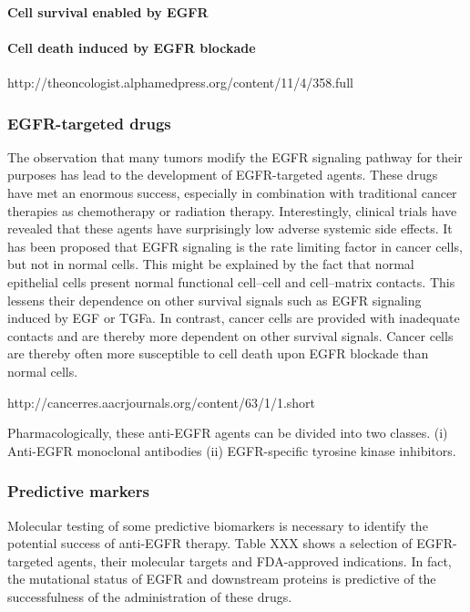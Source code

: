       \paragraph{Cell survival enabled by EGFR}

      \paragraph{Cell death induced by EGFR blockade}

      http://theoncologist.alphamedpress.org/content/11/4/358.full

    \subsubsection{EGFR-targeted drugs}

      The observation that many tumors modify the EGFR signaling pathway for
      their purposes has lead to the development of EGFR-targeted agents. These
      drugs have met an enormous success, especially in combination with
      traditional cancer therapies as chemotherapy or radiation therapy.
      Interestingly, clinical trials have revealed that these agents have
      surprisingly low adverse systemic side effects. It has been proposed that
      EGFR signaling is the rate limiting factor in cancer cells, but not in
      normal cells. This might be explained by the fact that normal epithelial
      cells present normal functional cell--cell and cell--matrix contacts. This
      lessens their dependence on other survival signals such as EGFR signaling
      induced by EGF or TGFa. In contrast, cancer cells are provided with
      inadequate contacts and are thereby more dependent on other survival
      signals. Cancer cells are thereby often more susceptible to cell death
      upon EGFR blockade than normal cells.

      http://cancerres.aacrjournals.org/content/63/1/1.short

      Pharmacologically, these anti-EGFR agents can be divided into two classes.
      (i) Anti-EGFR monoclonal antibodies
      (ii) EGFR-specific tyrosine kinase inhibitors.

    \subsubsection{Predictive markers}

      Molecular testing of some predictive biomarkers is necessary to identify
      the potential success of anti-EGFR therapy. Table XXX shows a selection of
      EGFR-targeted agents, their molecular targets and FDA-approved indications.
      In fact, the mutational status of EGFR and downstream proteins is
      predictive of the successfulness of the administration of these drugs.

